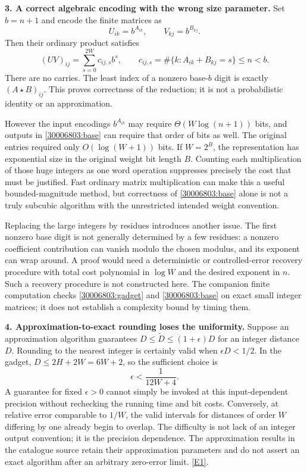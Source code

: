 \documentclass[11pt,a4paper]{article}
\newcommand{\eref}[2]{\hyperlink{extra:#1:#2}{[E#2]}}
\numberwithin{equation}{section}
\begin{document}
\textbf{3. A correct algebraic encoding with the wrong size parameter.}
Set $b=n+1$ and encode the finite matrices as
\[
 U_{ik}=b^{A_{ik}},\qquad V_{kj}=b^{B_{kj}}.
\]
Then their ordinary product satisfies
\begin{equation}\label{30006803:base}
 (UV)_{ij}=\sum_{s=0}^{2W}c_{ij,s}b^s,
 \qquad c_{ij,s}=\#\{k:A_{ik}+B_{kj}=s\}\leq n<b.
\end{equation}
There are no carries. The least index of a nonzero base-$b$ digit is
exactly $(A\star B)_{ij}$. This proves correctness of the reduction; it
is not a probabilistic identity or an approximation.

However the input encodings $b^{A_{ik}}$ may require
$\Theta(W\log(n+1))$ bits, and outputs in \eqref{30006803:base} can require
that order of bits as well. The original entries required only
$O(\log(W+1))$ bits. If $W=2^B$, the representation has exponential
size in the original weight bit length $B$. Counting each multiplication
of those huge integers as one word operation suppresses precisely the
cost that must be justified. Fast ordinary matrix multiplication can
make this a useful bounded-magnitude method, but correctness of
\eqref{30006803:base} alone is not a truly subcubic algorithm with the
unrestricted intended weight convention.

Replacing the large integers by residues introduces another issue. The
first nonzero base digit is not generally determined by a few residues:
a nonzero coefficient contribution can vanish modulo the chosen modulus,
and its exponent can wrap around. A proof would need a deterministic
or controlled-error recovery procedure with total cost polynomial in
$\log W$ and the desired exponent in $n$. Such a recovery procedure is
not constructed here. The companion finite computation checks
\eqref{30006803:gadget} and \eqref{30006803:base} on exact small integer matrices;
it does not establish a complexity bound by timing them.

\textbf{4. Approximation-to-exact rounding loses the uniformity.}
Suppose an approximation algorithm guarantees
$D\leq\widetilde D\leq(1+\epsilon)D$ for an integer distance $D$.
Rounding to the nearest integer is certainly valid when
$\epsilon D<1/2$. In the gadget, $D\leq2H+2W=6W+2$,
so the sufficient choice is
\begin{equation}\label{30006803:rounding}
 \epsilon<\frac1{12W+4}.
\end{equation}
A guarantee for fixed $\epsilon>0$ cannot simply be invoked at this
input-dependent precision without rechecking the running time and bit
costs. Conversely, at relative error comparable to $1/W$, the valid
intervals for distances of order $W$ differing by one already begin to
overlap. The difficulty is not lack of an integer output convention;
it is the precision dependence. The approximation results in the
catalogue source retain their approximation parameters and do not assert
an exact algorithm after an arbitrary zero-error limit.
\eref{30006803}{1}.
\end{document}
